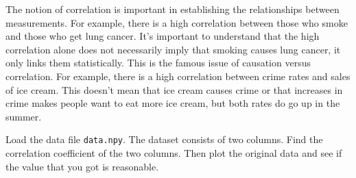 The notion of correlation is important in establishing the relationships between measurements.  For example, there is a high correlation between those who smoke and those who get lung cancer.  It's important to understand that the high correlation alone does not necessarily imply that smoking causes lung cancer, it only links them statistically.  This is the famous issue of causation versus correlation.  For example, there is a high correlation between crime rates and sales of ice cream.  This doesn't mean that ice cream causes crime or that increases in crime makes people want to eat more ice cream, but both rates do go up in the summer.

\begin{problem}
Load the data file \texttt{data.npy}.
The dataset consists of two columns.  Find the correlation coefficient of the two columns.  Then plot the original data and see if the value that you got is reasonable.
\end{problem}
